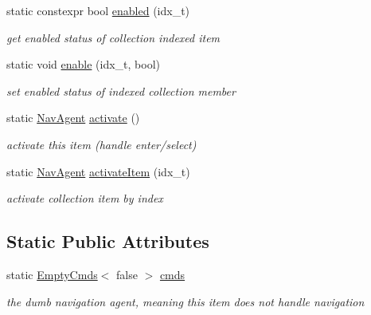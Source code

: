 \begin{DoxyCompactItemize}
static constexpr bool \hyperlink{structEmpty_adc2d105531fb7b43f60fcd9deaaaa71c}{enabled} (idx\+\_\+t)
\begin{DoxyCompactList}\small\item\em get enabled status of collection indexed item \end{DoxyCompactList}\item 
\mbox{\label{structEmpty_af4997efbad97edae86108c77b4b0f26a}} 
static void \hyperlink{structEmpty_af4997efbad97edae86108c77b4b0f26a}{enable} (idx\+\_\+t, bool)
\begin{DoxyCompactList}\small\item\em set enabled status of indexed collection member \end{DoxyCompactList}\item 
static \hyperlink{structNavAgent}{Nav\+Agent} \hyperlink{structEmpty_ade3cccf531dad6fe907c3a9764204e1c}{activate} ()
\begin{DoxyCompactList}\small\item\em activate this item (handle enter/select) \end{DoxyCompactList}\item 
\mbox{\label{structEmpty_a2f4d5ca0c3193ed070ef49c4dcc9eb5c}} 
static \hyperlink{structNavAgent}{Nav\+Agent} \hyperlink{structEmpty_a2f4d5ca0c3193ed070ef49c4dcc9eb5c}{activate\+Item} (idx\+\_\+t)
\begin{DoxyCompactList}\small\item\em activate collection item by index \end{DoxyCompactList}\end{DoxyCompactItemize}
\subsection*{Static Public Attributes}
\begin{DoxyCompactItemize}
\item 
\mbox{\label{structEmpty_a17b77b2cc02c543127f2db455344f2d3}} 
static \hyperlink{structEmptyCmds}{Empty\+Cmds}$<$ false $>$ \hyperlink{structEmpty_a17b77b2cc02c543127f2db455344f2d3}{cmds}
\begin{DoxyCompactList}\small\item\em the dumb navigation agent, meaning this item does not handle navigation \end{DoxyCompactList}\end{DoxyCompactItemize}



